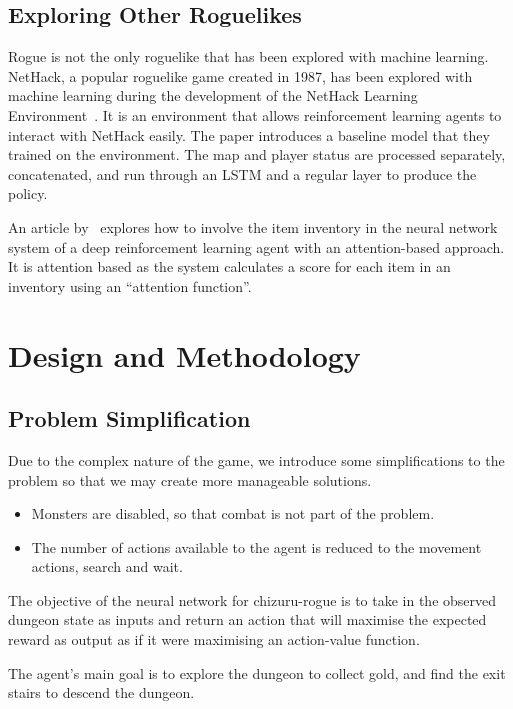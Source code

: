 \documentclass[12pt,a4paper]{article}
\begin{document}
    \subsection{Exploring Other Roguelikes}\label{subsec:exploring-other-roguelikes}
    Rogue is not the only roguelike that has been explored with machine learning.
    NetHack, a popular roguelike game created in 1987, has been explored with machine learning during the development of the NetHack Learning Environment~\citep{kuttler20}.
    It is an environment that allows reinforcement learning agents to interact with NetHack easily.
    The paper introduces a baseline model that they trained on the environment.
    The map and player status are processed separately, concatenated, and run through an LSTM and a regular layer to produce the policy.

    An article by~\citet{izumiya21} explores how to involve the item inventory in the neural network system of a deep reinforcement learning agent with an attention-based approach.
    It is attention based as the system calculates a score for each item in an inventory using an ``attention function''.

    \section{Design and Methodology}\label{sec:design-and-methodology}
    \subsection{Problem Simplification}\label{subsec:problem-simplification}
    Due to the complex nature of the game, we introduce some simplifications to the problem so that
    we may create more manageable solutions.

    \begin{itemize}
        \item Monsters are disabled, so that combat is not part of the problem.
        \item The number of actions available to the agent is reduced to the movement actions, search and wait.
    \end{itemize}

    The objective of the neural network for chizuru-rogue is to take in the observed dungeon state as inputs and return an action that will maximise the expected reward as output as if it were maximising an action-value function.

    The agent's main goal is to explore the dungeon to collect gold, and find the exit stairs to descend the dungeon.
\end{document}
